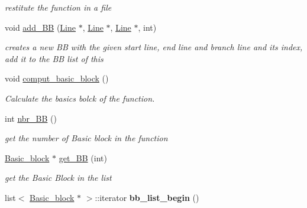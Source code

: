 \begin{DoxyCompactItemize}
\begin{DoxyCompactList}\small\item\em restitute the function in a file \end{DoxyCompactList}\item 
\hypertarget{class_function_a5b1550f534becc9b7ae9fe679fc8db10}{void \hyperlink{class_function_a5b1550f534becc9b7ae9fe679fc8db10}{add\+\_\+\+B\+B} (\hyperlink{class_line}{Line} $\ast$, \hyperlink{class_line}{Line} $\ast$, \hyperlink{class_line}{Line} $\ast$, int)}\label{class_function_a5b1550f534becc9b7ae9fe679fc8db10}

\begin{DoxyCompactList}\small\item\em creates a new B\+B with the given start line, end line and branch line and its index, add it to the B\+B list of this \end{DoxyCompactList}\item 
\hypertarget{class_function_a6094f123294ccbb891fa4145fd5b1b0a}{void \hyperlink{class_function_a6094f123294ccbb891fa4145fd5b1b0a}{comput\+\_\+basic\+\_\+block} ()}\label{class_function_a6094f123294ccbb891fa4145fd5b1b0a}

\begin{DoxyCompactList}\small\item\em Calculate the basics bolck of the function. \end{DoxyCompactList}\item 
\hypertarget{class_function_a4ddde4ac1ff488dfcbfcaee71f727a48}{int \hyperlink{class_function_a4ddde4ac1ff488dfcbfcaee71f727a48}{nbr\+\_\+\+B\+B} ()}\label{class_function_a4ddde4ac1ff488dfcbfcaee71f727a48}

\begin{DoxyCompactList}\small\item\em get the number of Basic block in the function \end{DoxyCompactList}\item 
\hypertarget{class_function_ae11968b8ca5497526e9448b67823d373}{\hyperlink{class_basic__block}{Basic\+\_\+block} $\ast$ \hyperlink{class_function_ae11968b8ca5497526e9448b67823d373}{get\+\_\+\+B\+B} (int)}\label{class_function_ae11968b8ca5497526e9448b67823d373}

\begin{DoxyCompactList}\small\item\em get the Basic Block in the list \end{DoxyCompactList}\item 
\hypertarget{class_function_a18797dfd75ba34acf0e73b69da8311ec}{list$<$ \hyperlink{class_basic__block}{Basic\+\_\+block} $\ast$ $>$\+::iterator {\bfseries bb\+\_\+list\+\_\+begin} ()}\label{class_function_a18797dfd75ba34acf0e73b69da8311ec}


\end{DoxyCompactItemize}
